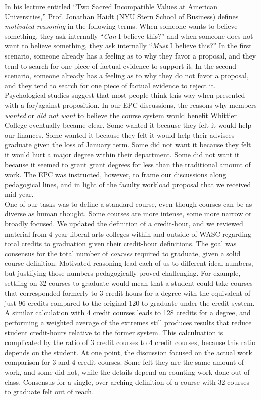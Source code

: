 \documentclass[../../../main.tex]{subfiles}
\begin{document}
\vspace{0.25cm}
In his lecture entitled ``Two Sacred Incompatible Values at American Universities,'' \cite{haidt} Prof. Jonathan Haidt (NYU Stern School of Business) defines \textit{motivated reasoning} in the following terms.  When someone wants to believe something, they ask internally ``\textit{Can} I believe this?'' and when someone does not want to believe something, they ask internally ``\textit{Must} I believe this?''  In the first scenario, someone already has a feeling as to why they favor a proposal, and they tend to search for one piece of factual evidence to support it.  In the second scenario, someone already has a feeling as to why they do not favor a proposal, and they tend to search for one piece of factual evidence to reject it.  Psychological studies suggest that most people think this way when presented with a for/against proposition.  In our EPC discussions, the reasons why members \textit{wanted} or \textit{did not want} to believe the course system would benefit Whittier College eventually became clear.  Some wanted it because they felt it would help our finances.  Some wanted it because they felt it would help their advisees graduate given the loss of January term.  Some did not want it because they felt it would hurt a major degree within their department.  Some did not want it because it seemed to grant grant degrees for less than the traditional amount of work.  The EPC was instructed, however, to frame our discussions along pedagogical lines, and in light of the faculty workload proposal that we received mid-year.
\\
\vspace{0.25cm}
One of our tasks was to define a standard course, even though courses can be as diverse as human thought.  Some courses are more intense, some more narrow or broadly focused.  We updated the definition of a credit-hour, and we reviewed material from 4-year liberal arts colleges within and outside of WASC regarding total credits to graduation given their credit-hour definitions.  The goal was consensus for the total number of \textit{courses} required to graduate, given a solid course definition.  Motivated reasoning lead each of us to different ideal numbers, but justifying those numbers pedagogically proved challenging.  For example, settling on 32 courses to graduate would mean that a student could take courses that corresponded formerly to 3 credit-hours for a degree with the equivalent of just 96 credits compared to the original 120 to graduate under the credit system.  A similar calculation with 4 credit courses leads to 128 credits for a degree, and performing a weighted average of the extremes still produces results that reduce student credit-hours relative to the former system.  This calculuation is complicated by the ratio of 3 credit courses to 4 credit courses, because this ratio depends on the student.  At one point, the discussion focused on the actual work comparison for 3 and 4 credit courses.  Some felt they are the same amount of work, and some did not, while the details depend on counting work done out of class.  Consensus for a single, over-arching definition of a course with 32 courses to graduate felt out of reach.
\end{document}
